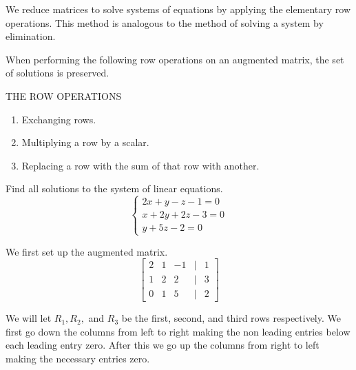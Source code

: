 We reduce matrices to solve systems of equations by applying the elementary row operations. This method is analogous to the method of solving a system by elimination.

When performing the following row operations on an augmented matrix, the set of solutions is preserved.

THE ROW OPERATIONS
\begin{enumerate}
    \item Exchanging rows.
    \item Multiplying a row by a scalar.
    \item Replacing a row with the sum of that row with another.
\end{enumerate}

\begin{example}
    Find all solutions to the system of linear equations.
   \[ \begin{cases}
        2x + y - z - 1 = 0\\
        x + 2y +2z -3 = 0 \\
        y + 5z - 2 =0
    \end{cases}\]
    \begin{solution}
        We first set up the augmented matrix.
        \[\begin{bmatrix}
            2 & 1 & -1 & \vert & 1 \\
            1 & 2 & 2 & \vert & 3 \\
            0 & 1 & 5 & \vert & 2
        \end{bmatrix}\]

        We will let \(R_1, R_2,\) and \(R_3\) be the first, second, and third rows respectively.
        We first go down the columns from left to right making the non leading entries below each leading entry zero. After this we go up the columns from right to left making the necessary entries zero.


\end{solution}
\end{example}
